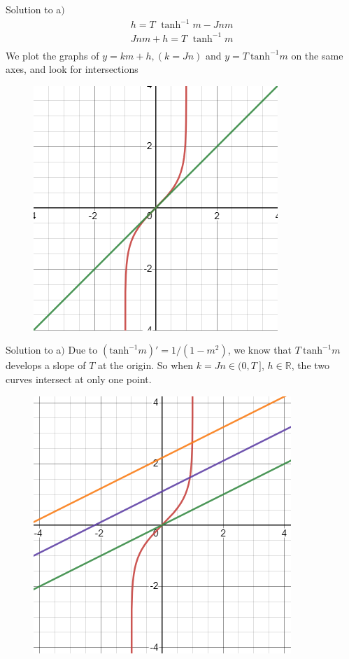 \documentclass[10pt,aspectratio=43,mathserif,table]{beamer}
\begin{document}
\begin{frame}{Solution to a$)$}
	$$
	\begin{array}{l}
		h=T\,\,\tanh ^{-1}m-Jnm\\
		Jnm+h=T\,\,\tanh ^{-1}m\\
	\end{array}	
	$$
	We plot the graphs of $y = km + h, (k=Jn)$ and $y = T\ \mathrm{tanh}^{-1}m$ on the same axes, and look for intersections
	\begin{figure}
		\centering
		\includegraphics[width=0.4\linewidth]{p1.jpg}
	\end{figure}
	
\end{frame}

\begin{frame}{Solution to a$)$}
	Due to $\left( \mathrm{tanh}^{-1} m \right) \prime=1/(1-m^2)$, we know that $T\ \mathrm{tanh}^{-1}m$ develops a slope of $T$ at the origin. So when $k=Jn \in (0, T\ ]$, $h \in \mathbb{R}$, the two curves intersect at only one point.
	\begin{figure}
		\centering
		\includegraphics[width=0.4\linewidth]{p2.jpg}
	\end{figure}
\end{frame}
\end{document}

